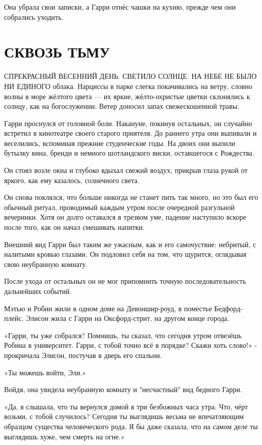 \documentclass[a5paper, 9pt,
final, openany, twoside=true]{memoir}
\begin{document}
Она убрала свои записки, а Гарри отнёс чашки на кухню, прежде чем они собрались уходить.
\chapter{СКВОЗЬ ТЬМУ}
С{ ПРЕКРАСНЫЙ ВЕСЕННИЙ ДЕНЬ. СВЕТИЛО СОЛНЦЕ. НА НЕБЕ НЕ БЫЛО НИ ЕДИНОГО} облака. Нарциссы в парке слегка покачивались на ветру, словно волны в море жёлтого цвета — их яркие, жёлто-охристые цветки склонялись к солнцу, как на богослужении. Ветер доносил запах свежескошенной травы.\bigskip

Гарри проснулся от головной боли. Накануне, покинув остальных, он случайно встретил в кинотеатре своего старого приятеля. До раннего утра они выпивали и веселились, вспоминая прежние студенческие годы. На двоих они выпили бутылку вина, бренди и немного шотландского виски, оставшегося с Рождества.

Он стоял возле окна и глубоко вдыхал свежий воздух, прикрыв глаза рукой от яркого, как ему казалось, солнечного света.

Он снова поклялся, что больше никогда не станет пить так много, но это был его обычный ритуал, проводимый каждым утром после очередной разгульной вечеринки. Хотя он долго оставался в трезвом уме, падение наступило вскоре после того, как он начал смешивать напитки.

Внешний вид Гарри был таким же ужасным, как и его самочуствие: небритый, с налитыми кровью глазами. Он подловил себя на том, что щурится, оглядывая свою неубранную комнату.

После ухода от остальных он не мог припомнить точную последовательность дальнейших событий.

Мэтью и Робин жили в одном доме на Девоншир-роуд, в поместье Бедфорд-плейс. Элисон жила с Гарри на Оксфорд-стрит, на другом конце города.\bigskip

«Гарри, ты уже собрался? Помнишь, ты сказал, что сегодня утром отвезёшь Робина в университет. Гарри, с тобой точно всё в порядке? Скажи хоть слово!» - прокричала Элисон, постучав в дверь его спальни.

«Ты можешь войти, Эли.»

Войдя, она увидела неубранную комнату и "несчастный" вид бедного Гарри.

«Да, я слышала, что ты вернулся домой в три безбожных часа утра. Что, чёрт возьми, с тобой случилось? Сегодня ты выглядишь весьма не впечатляющим образцом существа человеческого рода. Я бы даже сказала, что на самом деле ты выглядишь хуже, чем смерть на огне.»
\end{document}
